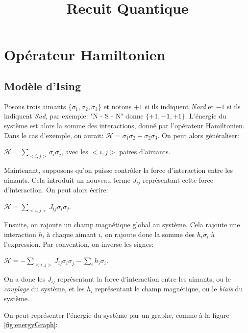 \documentclass[12pt,a4paper]{article}
\title{Recuit Quantique}
\date{}
\begin{document}
\maketitle

\section{Opérateur Hamiltonien}
\subsection*{Modèle d'Ising}
Posons trois aimants $\{\sigma_1, \sigma_2, \sigma_3\}$ et notons $+1$ si ils indiquent \textit{Nord} et $-1$ si ils indiquent \textit{Sud}, par exemple:  "N - S - N" donne $\{+1, -1, +1\}$. L'énergie du système est alors la somme des interactions, donné par l'opérateur Hamiltonien. Dans le cas d'exemple, on aurait: $\mathcal{H} = \sigma_1 \sigma_2 + \sigma_2 \sigma_3$. On peut alors généraliser:  

$\mathcal{H} = \displaystyle\sum_{<i, j>} \sigma_i \sigma_j$, avec les $<i, j>$ paires d'aimants.

Maintenant, supposons qu'on puisse contrôler la force d'interaction entre les aimants. Cela introduit un nouveau terme $J_{ij}$ représentant cette force d'interaction. On peut alors écrire: 

$\mathcal{H} = \displaystyle\sum_{<i, j>} J_{ij} \sigma_i \sigma_j$.

Ensuite, on rajoute un champ magnétique global au système. Cela rajoute une interaction $h_i$ à chaque aimant $i$, on rajoute donc la somme des $h_i \sigma_i$ à l'expression. Par convention, on inverse les signes: 

$\mathcal{H} = -\displaystyle\sum_{<i, j>} J_{ij} \sigma_i \sigma_j - \displaystyle\sum_{i} h_i \sigma_i $.

On a donc les $J_{ij}$ représentant la force d'interaction entre les aimants, ou le \textit{couplage} du système, et les $h_i$ représentant le champ magnétique, ou le \textit{biais} du système.

On peut représenter l'énergie du système par un graphe, comme à la figure \ref{fig:energyGraph}: 
\end{document}
